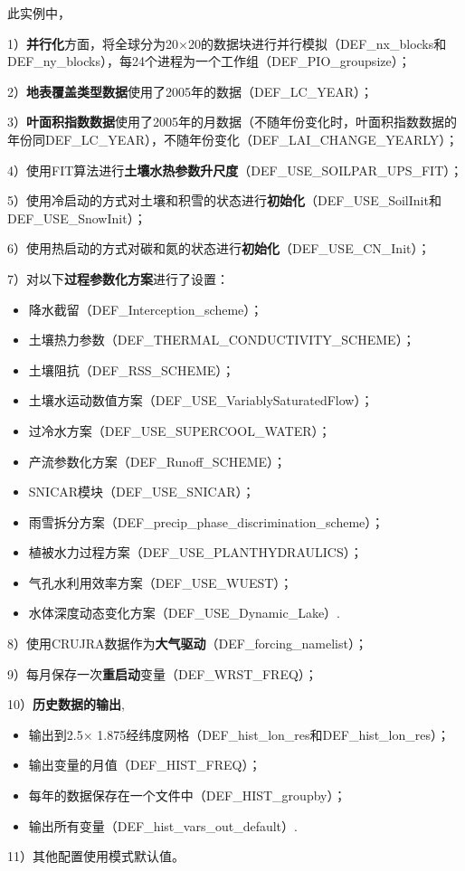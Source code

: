 \documentclass[a4paper,12pt,twoside]{article}
\begin{document}
此实例中，\par
1）\textbf{并行化}方面，将全球分为20\textdegree$\times$20\textdegree 的数据块进行并行模拟（DEF\_nx\_blocks和DEF\_ny\_blocks），每24个进程为一个工作组（DEF\_PIO\_groupsize）；\par
2）\textbf{地表覆盖类型数据}使用了2005年的数据（DEF\_LC\_YEAR）；\par
3）\textbf{叶面积指数数据}使用了2005年的月数据（不随年份变化时，叶面积指数数据的年份同DEF\_LC\_YEAR），不随年份变化（DEF\_LAI\_CHANGE\_YEARLY）；\par
4）使用FIT算法进行\textbf{土壤水热参数升尺度}（DEF\_USE\_SOILPAR\_UPS\_FIT）；\par
5）使用冷启动的方式对土壤和积雪的状态进行\textbf{初始化}（DEF\_USE\_SoilInit和DEF\_USE\_SnowInit）；\par
6）使用热启动的方式对碳和氮的状态进行\textbf{初始化}（DEF\_USE\_CN\_Init）；\par
7）对以下\textbf{过程参数化方案}进行了设置：
\begin{itemize}[nosep,leftmargin=4em]
    \item 降水截留（DEF\_Interception\_scheme）；
    \item 土壤热力参数（DEF\_THERMAL\_CONDUCTIVITY\_SCHEME）；
    \item 土壤阻抗（DEF\_RSS\_SCHEME）；
    \item 土壤水运动数值方案（DEF\_USE\_VariablySaturatedFlow）；
    \item 过冷水方案（DEF\_USE\_SUPERCOOL\_WATER）；
    \item 产流参数化方案（DEF\_Runoff\_SCHEME）；
    \item SNICAR模块（DEF\_USE\_SNICAR）；
    \item 雨雪拆分方案（DEF\_precip\_phase\_discrimination\_scheme）；
    \item 植被水力过程方案（DEF\_USE\_PLANTHYDRAULICS）；
    \item 气孔水利用效率方案（DEF\_USE\_WUEST）；
    \item 水体深度动态变化方案（DEF\_USE\_Dynamic\_Lake）.
\end{itemize}
\par
8）使用CRUJRA数据作为\textbf{大气驱动}（DEF\_forcing\_namelist）；\par
9）每月保存一次\textbf{重启动}变量（DEF\_WRST\_FREQ）；\par
10）\textbf{历史数据的输出},
\begin{itemize}[nosep,leftmargin=4em]
    \item 输出到2.5\textdegree $\times$ 1.875\textdegree 经纬度网格（DEF\_hist\_lon\_res和DEF\_hist\_lon\_res）；
    \item 输出变量的月值（DEF\_HIST\_FREQ）；
    \item 每年的数据保存在一个文件中（DEF\_HIST\_groupby）；
    \item 输出所有变量（DEF\_hist\_vars\_out\_default）.
\end{itemize}\par
11）其他配置使用模式默认值。
\end{document}
